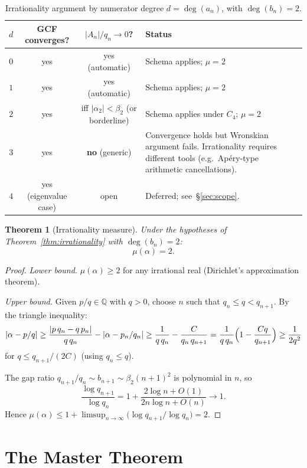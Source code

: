 \documentclass[11pt,a4paper]{article}
\newtheorem{theorem}{Theorem}
\theoremstyle{definition}
\theoremstyle{remark}
\newcommand{\abs}[1]{\lvert #1 \rvert}
\begin{document}
\begin{table}[h]
\centering
\caption{Irrationality argument by numerator degree $d = \deg(a_n)$,
  with $\deg(b_n) = 2$.}\label{tab:degrees}
\begin{tabular}{@{}cccp{6.4cm}@{}}
\toprule
$d$ & GCF converges? & $\abs{A_n}/q_n \to 0$? & Status \\
\midrule
$0$ & yes & yes (automatic) & Schema applies; $\mu=2$ \\
$1$ & yes & yes (automatic) & Schema applies; $\mu=2$ \\
$2$ & yes & iff $\abs{\alpha_2} < \beta_2$ (or borderline) &
  Schema applies under $C_4$; $\mu=2$ \\
$3$ & yes & \textbf{no} (generic) &
  Convergence holds but Wronskian argument fails.
  Irrationality requires different tools
  (e.g.\ Ap\'ery-type arithmetic cancellations). \\
$4$ & yes (eigenvalue case) & open & Deferred; see~\S\ref{sec:scope}. \\
\bottomrule
\end{tabular}
\end{table}


\begin{theorem}[Irrationality measure]\label{thm:mu}
Under the hypotheses of Theorem~\ref{thm:irrationality} with
$\deg(b_n) = 2$:
\[
  \mu(\alpha) = 2.
\]
\end{theorem}

\begin{proof}
\emph{Lower bound.}  $\mu(\alpha) \geq 2$ for any irrational real
(Dirichlet's approximation theorem).

\emph{Upper bound.}  Given $p/q \in \mathbb{Q}$ with $q > 0$, choose
$n$ such that $q_n \leq q < q_{n+1}$.  By the triangle inequality:
\[
  \abs{\alpha - p/q}
  \geq \frac{\abs{p\,q_n - q\,p_n}}{q\,q_n} - \abs{\alpha - p_n/q_n}
  \geq \frac{1}{q\,q_n} - \frac{C}{q_n\,q_{n+1}}
  = \frac{1}{q\,q_n}\Bigl(1 - \frac{Cq}{q_{n+1}}\Bigr)
  \geq \frac{1}{2q^2}
\]
for $q \leq q_{n+1}/(2C)$ (using $q_n \leq q$).

The gap ratio $q_{n+1}/q_n \sim b_{n+1} \sim \beta_2(n{+}1)^2$
is polynomial in $n$, so
\[
  \frac{\log q_{n+1}}{\log q_n}
  = 1 + \frac{2\log n + O(1)}{2n\log n + O(n)} \to 1.
\]
Hence $\mu(\alpha) \leq 1 + \limsup_{n\to\infty}
\bigl(\log q_{n+1}/\log q_n\bigr) = 2$.
\end{proof}


\section{The Master Theorem}\label{sec:master}
\end{document}
